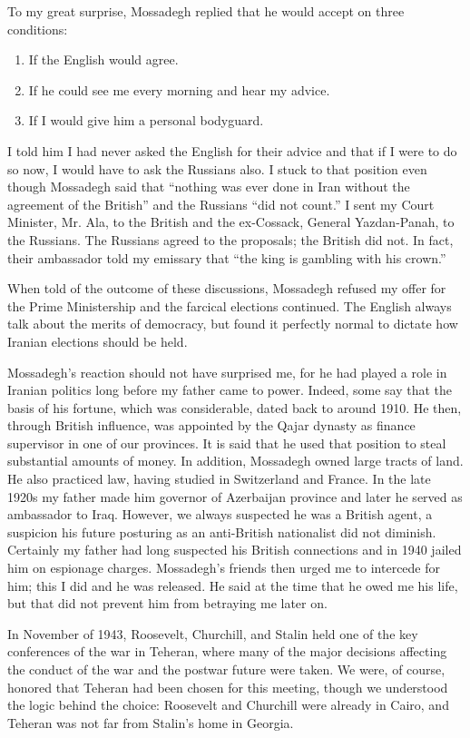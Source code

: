 To my great surprise, Mossadegh replied that he would accept on three conditions: 

\begin{enumerate}
\item If the English would agree. 
\item If he could see me every morning and hear my advice. 
\item If I would give him a personal bodyguard. 
\end{enumerate}

I told him I had never asked the English for their advice and that if I were to do so now, I would have to ask the Russians also. I stuck to that position even though Mossadegh said that “nothing was ever done in Iran without the agreement of the British” and the Russians “did not count.” I sent my Court Minister, Mr. Ala, to the British and the ex-Cossack, General Yazdan-Panah, to the Russians. The Russians agreed to the proposals; the British did not. In fact, their ambassador told my emissary that “the king is gambling with his crown.” 

When told of the outcome of these discussions, Mossadegh refused my offer for the Prime Ministership and the farcical elections continued. The English always talk about the merits of democracy, but found it perfectly normal to dictate how Iranian elections should be held. 

Mossadegh’s reaction should not have surprised me, for he had played a role in Iranian politics long before my father came to power. Indeed, some say that the basis of his fortune, which was considerable, dated back to around 1910. He then, through British influence, was appointed by the Qajar dynasty as finance supervisor in one of our provinces. It is said that he used that position to steal substantial amounts of money. In addition, Mossadegh owned large tracts of land. He also practiced law, having studied in Switzerland and France. In the late 1920s my father made him governor of Azerbaijan province and later he served as ambassador to Iraq. However, we always suspected he was a British agent, a suspicion his future posturing as an anti-British nationalist did not diminish. Certainly my father had long suspected his British connections and in 1940 jailed him on espionage charges. Mossadegh’s friends then urged me to intercede for him; this I did and he was released. He said at the time that he owed me his life, but that did not prevent him from betraying me later on. 

In November of 1943, Roosevelt, Churchill, and Stalin held one of the key conferences of the war in Teheran, where many of the major decisions affecting the conduct of the war and the postwar future were taken. We were, of course, honored that Teheran had been chosen for this meeting, though we understood the logic behind the choice: Roosevelt and Churchill were already in Cairo, and Teheran was not far from Stalin's home in Georgia. 

